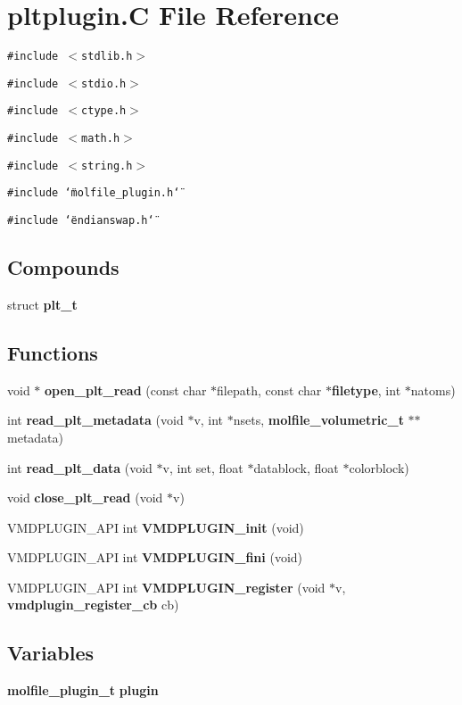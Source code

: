 \section{pltplugin.C File Reference}
\label{pltplugin_8C}
{\tt \#include $<$stdlib.h$>$}\par
{\tt \#include $<$stdio.h$>$}\par
{\tt \#include $<$ctype.h$>$}\par
{\tt \#include $<$math.h$>$}\par
{\tt \#include $<$string.h$>$}\par
{\tt \#include \char`\"{}molfile\_\-plugin.h\char`\"{}}\par
{\tt \#include \char`\"{}endianswap.h\char`\"{}}\par
\subsection*{Compounds}
\begin{CompactItemize}
\item 
struct {\bf plt\_\-t}
\end{CompactItemize}
\subsection*{Functions}
\begin{CompactItemize}
\item 
void $\ast$ {\bf open\_\-plt\_\-read} (const char $\ast$filepath, const char $\ast${\bf filetype}, int $\ast$natoms)
\item 
int {\bf read\_\-plt\_\-metadata} (void $\ast$v, int $\ast$nsets, {\bf molfile\_\-volumetric\_\-t} $\ast$$\ast$metadata)
\item 
int {\bf read\_\-plt\_\-data} (void $\ast$v, int set, float $\ast$datablock, float $\ast$colorblock)
\item 
void {\bf close\_\-plt\_\-read} (void $\ast$v)
\item 
VMDPLUGIN\_\-API int {\bf VMDPLUGIN\_\-init} (void)
\item 
VMDPLUGIN\_\-API int {\bf VMDPLUGIN\_\-fini} (void)
\item 
VMDPLUGIN\_\-API int {\bf VMDPLUGIN\_\-register} (void $\ast$v, {\bf vmdplugin\_\-register\_\-cb} cb)
\end{CompactItemize}
\subsection*{Variables}
\begin{CompactItemize}
\item 
{\bf molfile\_\-plugin\_\-t} {\bf plugin}
\end{CompactItemize}


